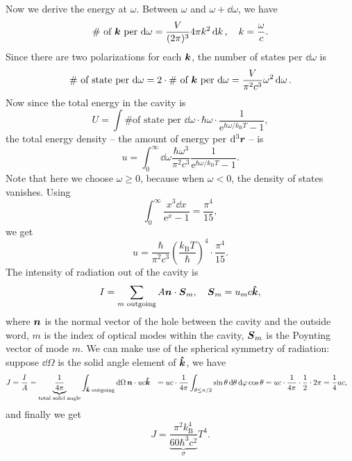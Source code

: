 \documentclass[hyperref, a4paper]{article}
\newcommand*{\ee}{\mathrm{e}}
\def\\{}%
\newcommand{\kB}{k_{\text{B}}}
\begin{document}
Now we derive the energy at $\omega$.
Between $\omega$ and $\omega + \dd{\omega}$, we have 
\[
    \text{\# of $\vb*{k}$ per $\dd{\omega}$} = 
    \frac{V}{(2\pi)^3} 4 \pi k^2 \dd{k}, \quad k = \frac{\omega}{c}.
\]
Since there are two polarizations for each $\vb*{k}$,
the number of states per $\dd{\omega}$ is 
\begin{equation}
    \text{\# of state per $\dd{\omega}$} 
    = 2 \cdot \text{\# of $\vb*{k}$ per $\dd{\omega}$} 
    = \frac{V}{\pi^2 c^3} \omega^2 \dd{\omega}.
\end{equation}
Now since the total energy in the cavity is 
\begin{equation}
    U = \int \text{\# of state per $\dd{\omega}$}  
    \cdot \hbar \omega \cdot \frac{1}{\ee^{\hbar \omega / \kB T} - 1},
\end{equation}
the total energy density -- the amount of energy per $\dd[3]{\vb*{r}}$ -- is 
\begin{equation}
    u = \int_0^\infty \dd{\omega} \frac{\hbar \omega^3}{\pi^2 c^3} 
    \frac{1}{\ee^{\hbar \omega / \kB T} - 1}.
\end{equation}
Note that here we choose $\omega \geq 0$,
because when $\omega < 0$, 
the density of states vanishes. 
Using 
\[
    \int_0^\infty \frac{x^3 \dd{x}}{\ee^{x} - 1} = \frac{\pi^4}{15}, 
\]
we get 
\begin{equation}
    u = \frac{\hbar}{\pi^2 c^3} \left(\frac{\kB T}{\hbar}\right)^4 \cdot \frac{\pi^4}{15}.
\end{equation}
The intensity of radiation out of the cavity is 
\[
    I = \sum_{\text{$m$ outgoing}} A \vb*{n} \cdot \vb*{S}_{m}, 
    \quad \vb*{S}_m = u_m c \vu*{k},
\]
where $\vb*{n}$ is the normal vector of the hole between the cavity and the outside word, 
$m$ is the index of optical modes within the cavity,
$\vb*{S}_m$ is the Poynting vector of mode $m$.
We can make use of the spherical symmetry of radiation:
suppose $\dd{\Omega}$ is the solid angle element of $\vu*{k}$,
we have 
\[
    \begin{aligned}
        J = \frac{I}{A} &= 
        \underbrace{\frac{1}{4\pi}}_{\text{total solid angle}} 
        \int_{\text{$\vu*{k}$ outgoing}} \dd{\Omega}
        \vb*{n} \cdot u c \vu*{k} \\
        &= uc \cdot \frac{1}{4\pi} \int_{\theta \leq \pi / 2} \sin \theta \dd{\theta} \dd{\varphi}
        \cos \theta \\
        &= uc \cdot \frac{1}{4\pi} \cdot \frac{1}{2} \cdot 2 \pi = \frac{1}{4} u c,
    \end{aligned}
\]
and finally we get 
\begin{equation}
    J = \underbrace{
        \frac{\pi^2 \kB^4}{60 \hbar^3 c^2}
    }_\sigma T^4.
\end{equation}
\end{document}

